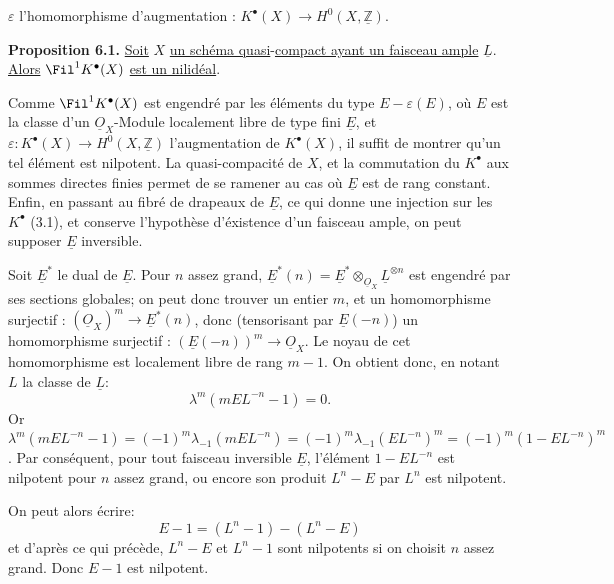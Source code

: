 
$\varepsilon$ l'homomorphisme d'augmentation : $K^{\bullet}(X)\longrightarrow H^0(X,\underline{\mathbb Z})$.

\textbf{Proposition 6.1.} \uline{Soit} $X$ \uline{un schéma quasi}-\uline{compact ayant un faisceau ample} $\underline{L}$. \uline{Alors} $\Fil^1K^{\bullet}(X)$ \uline{est un nilidéal}.

Comme $\Fil^1K^{\bullet}(X)$ est engendré par les éléments du type $E-\varepsilon(E)$, où $E$ est la classe d'un $\underline{O}_X$-Module localement libre de type fini $\underline{E}$, et $\varepsilon:K^{\bullet}(X)\to H^0(X,\underline{\mathbb Z})$ l'augmentation de $K^{\bullet}(X)$, il suffit de montrer qu'un tel élément est nilpotent. La quasi-compacité de $X$, et la commutation du $K^{\bullet}$ aux sommes directes finies permet de se ramener au cas où $\underline{E}$ est de rang constant. Enfin, en passant au fibré de drapeaux de $\underline{E}$, ce qui donne une injection sur les $K^{\bullet}$ (3.1), et conserve l'hypothèse d'éxistence d'un faisceau ample, on peut supposer $\underline{E}$ inversible.

Soit $\underline{E}^*$ le dual de $\underline{E}$. Pour $n$ assez grand, $\underline{E}^*(n)=\underline{E}^*\otimes_{\underline{O}_X}\underline{L}^{\otimes n}$ est engendré par ses sections globales; on peut donc trouver un entier $m$, et un homomorphisme surjectif : $(\underline{O}_X)^m\longrightarrow \underline{E}^*(n)$, donc (tensorisant par $\underline{E}(-n)$) un homomorphisme surjectif : $(\underline{E}(-n))^m\longrightarrow\underline{O}_X$. Le noyau de cet homomorphisme est localement libre de rang $m-1$. On obtient donc, en notant $L$ la classe de $\underline{L}$:
\[
  \lambda^m(mEL^{-n}-1)=0 .
\]
Or $\lambda^m(mEL^{-n}-1)=(-1)^m\lambda_{-1}(mEL^{-n})=(-1)^m\lambda_{-1}(EL^{-n})^m=(-1)^m(1-EL^{-n})^m$. Par conséquent, pour tout faisceau inversible $\underline{E}$, l'élément $1-EL^{-n}$ est nilpotent pour $n$ assez grand, ou encore son produit $L^n-E$ par $L^n$ est nilpotent.

On peut alors écrire:
\[
  E-1=(L^n-1)-(L^n-E)
\]
et d'après ce qui précède, $L^n-E$ et $L^n-1$ sont nilpotents si on choisit $n$ assez grand. Donc $E-1$ est nilpotent.


